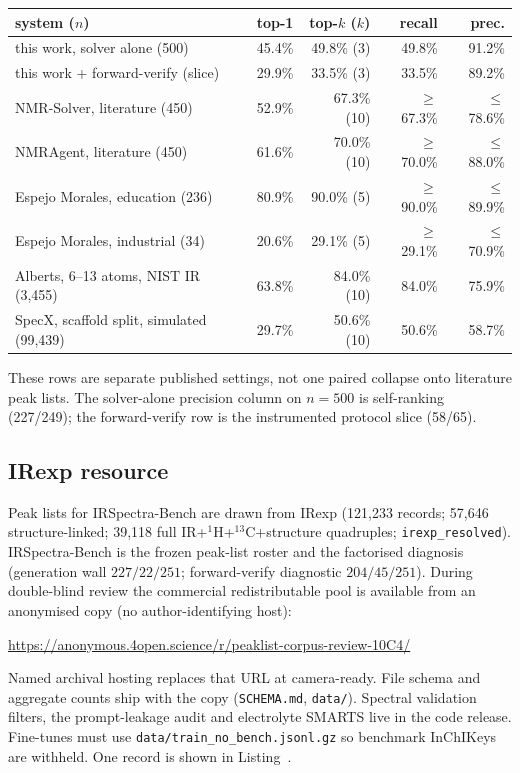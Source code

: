 \begin{center}
\begin{minipage}{\linewidth}
\centering
{}
\scriptsize
\setlength{\tabcolsep}{4pt}
\begin{tabular}{@{}lrrrr@{}}
\toprule
system ($n$) & top-1 & top-$k$ ($k$) & recall & prec. \\
\midrule
this work, solver alone (500) & 45.4\% & 49.8\% (3) & 49.8\% & 91.2\% \\
this work + forward-verify (slice) & 29.9\% & 33.5\% (3) & 33.5\% & 89.2\% \\
NMR-Solver, literature (450) & 52.9\% & 67.3\% (10) & $\geq$67.3\% & $\leq$78.6\% \\
NMRAgent, literature (450) & 61.6\% & 70.0\% (10) & $\geq$70.0\% & $\leq$88.0\% \\
Espejo Morales, education (236) & 80.9\% & 90.0\% (5) & $\geq$90.0\% & $\leq$89.9\% \\
Espejo Morales, industrial (34) & 20.6\% & 29.1\% (5) & $\geq$29.1\% & $\leq$70.9\% \\
Alberts, 6--13 atoms, NIST IR (3,455) & 63.8\% & 84.0\% (10) & 84.0\% & 75.9\% \\
SpecX, scaffold split, simulated (99,439) & 29.7\% & 50.6\% (10) & 50.6\% & 58.7\% \\
\bottomrule
\end{tabular}
\end{minipage}
\end{center}

These rows are separate published settings, not one paired collapse onto literature peak lists.
The solver-alone precision column on $n{=}500$ is self-ranking (227/249);
the forward-verify row is the instrumented protocol slice (58/65).
\FloatBarrier

\subsection{IRexp resource}
\label{si:split}

Peak lists for IRSpectra-Bench are drawn from IRexp (121,233 records;
57,646 structure-linked; 39,118 full IR+$^1$H+$^{13}$C+structure
quadruples; \texttt{irexp\_resolved}).
IRSpectra-Bench is the frozen peak-list roster and the factorised
diagnosis (generation wall $227/22/251$; forward-verify diagnostic
$204/45/251$).
During double-blind review the commercial redistributable pool is
available from an anonymised copy (no author-identifying host):
\begin{center}
\url{https://anonymous.4open.science/r/peaklist-corpus-review-10C4/}
\end{center}
Named archival hosting replaces that URL at camera-ready.
File schema and aggregate counts ship with the copy
(\texttt{SCHEMA.md}, \texttt{data/}).
Spectral validation filters, the prompt-leakage audit and electrolyte
SMARTS live in the code release.
Fine-tunes must use \texttt{data/train\_no\_bench.jsonl.gz} so benchmark
InChIKeys are withheld.
One record is shown in Listing~.

